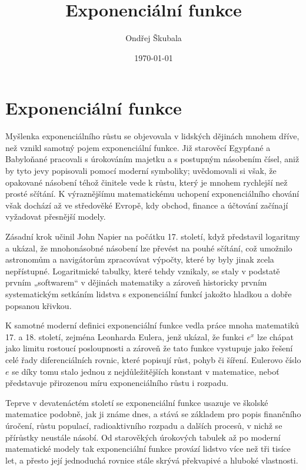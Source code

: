 \documentclass[12pt,a4paper]{article}
\title{Exponenciální funkce}
\author{Ondřej Škubala}
\date{\today}
\begin{document}
\maketitle
\newpage

\section{Exponenciální funkce}


\begin{historicalbox}
Myšlenka exponenciálního růstu se objevovala v lidských dějinách mnohem dříve,
než vznikl samotný pojem exponenciální funkce.
Již starověcí Egypťané a Babyloňané pracovali s úrokováním majetku
a s postupným násobením čísel,
aniž by tyto jevy popisovali pomocí moderní symboliky;
uvědomovali si však, že opakované násobení téhož činitele vede k růstu,
který je mnohem rychlejší než prosté sčítání.
K výraznějšímu matematickému uchopení exponenciálního chování však dochází až ve středověké Evropě,
kdy obchod, finance a účtování začínají vyžadovat přesnější modely.

Zásadní krok učinil John Napier na počátku 17. století,
když představil logaritmy a ukázal, že mnohonásobné násobení lze převést na pouhé sčítání,
což umožnilo astronomům a navigátorům zpracovávat výpočty, které by byly jinak zcela nepřístupné.
Logaritmické tabulky, které tehdy vznikaly, se staly v podstatě prvním „softwarem“ v dějinách matematiky
a zároveň historicky prvním systematickým setkáním lidstva s exponenciální funkcí jakožto hladkou
a dobře popsanou křivkou.

K samotné moderní definici exponenciální funkce vedla práce mnoha matematiků 17. a 18. století,
zejména Leonharda Eulera, jenž ukázal, že funkci $e^{x}$ lze chápat jako limitu rostoucí posloupnosti
a zároveň že tato funkce vystupuje jako řešení celé řady diferenciálních rovnic,
které popisují růst, pohyb či šíření. Eulerovo číslo $e$ se díky tomu stalo jednou
z nejdůležitějších konstant v matematice, neboť představuje přirozenou míru exponenciálního růstu i rozpadu.

Teprve v devatenáctém století se exponenciální funkce usazuje ve školské matematice podobně,
jak ji známe dnes, a stává se základem pro popis finančního úročení, růstu populací,
radioaktivního rozpadu a dalších procesů, v nichž se přírůstky neustále násobí.
Od starověkých úrokových tabulek až po moderní matematické modely tak exponenciální
funkce provází lidstvo více než tři tisíce let,
a přesto její jednoduchá rovnice stále skrývá překvapivé a hluboké vlastnosti.
\end{historicalbox}
\end{document}
